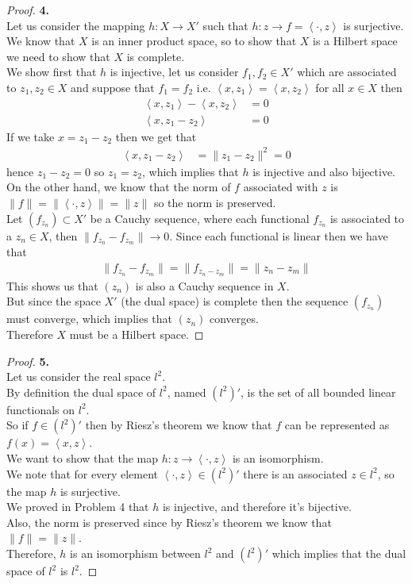 \documentclass[11pt]{article}
\newcommand{\inprd}[1]{\left\langle{#1}\right\rangle}
\theoremstyle{definition}
\begin{document}
\cleardoublepage
\begin{proof}{\textbf{4.}}\\
Let us consider the mapping $h:X \to X'$ such that $h:z \to f = \inprd{\cdot, z}$
is surjective.\\
We know that $X$ is an inner product space, so to show that $X$ is a Hilbert
space we need to show that $X$ is complete.\\
We show first that $h$ is injective, let us consider $f_1, f_2 \in X'$ which 
are associated to $z_1, z_2 \in X$ and suppose that $f_1 = f_2$ i.e.
$\inprd{x,z_1} = \inprd{x, z_2}$ for all $x \in X$ then
\begin{align*}
    \inprd{x,z_1} - \inprd{x, z_2} &= 0\\
    \inprd{x,z_1 - z_2} &= 0
\end{align*}
If we take $x = z_1 - z_2$ then we get that
\begin{align*}
    \inprd{x,z_1 - z_2} &= \|z_1 - z_2\|^2 = 0
\end{align*}
hence $z_1 - z_2 = 0$ so $z_1 = z_2$, which implies that $h$ is injective and
also bijective.\\
On the other hand, we know that the norm of $f$ associated with $z$ is
$\|f\| = \|\inprd{\cdot, z}\| = \|z\|$ so the norm is preserved.\\
Let $(f_{z_n})\subset X'$ be a Cauchy sequence, where each functional $f_{z_n}$
is associated to a $z_n \in X$, then $\|f_{z_n} - f_{z_m}\| \to 0$. Since each 
functional is linear then we have that
\begin{align*}
    \|f_{z_n} - f_{z_m}\| = \|f_{z_n - z_m}\| = \|z_n - z_m\|
\end{align*}
This shows us that $(z_n)$ is also a Cauchy sequence in $X$. \\
But since the space $X'$ (the dual space) is complete then the sequence
$(f_{z_n})$ must converge, which implies that $(z_n)$ converges.\\
Therefore $X$ must be a Hilbert space.
\end{proof}

\cleardoublepage
\begin{proof}{\textbf{5.}}\\
Let us consider the real space $l^2$.\\
By definition the dual space of $l^2$, named $(l^2)'$, is the set of all
bounded linear functionals on $l^2$.\\
So if $f \in (l^2)'$ then by Riesz's theorem we know that $f$ can be
represented as $f(x) = \inprd{x, z}$.\\
We want to show that the map $h: z \to \inprd{\cdot, z}$ is an isomorphism.\\
We note that for every element $\inprd{\cdot, z} \in (l^2)'$ there is an
associated $z \in l^2$, so the map $h$ is surjective.\\
We proved in Problem 4 that $h$ is injective, and therefore it's bijective.\\
Also, the norm is preserved since by Riesz's theorem we know that
$\|f\| = \|z\|$.\\
Therefore, $h$ is an isomorphism between $l^2$ and $(l^2)'$ which implies that
the dual space of $l^2$ is $l^2$.    
\end{proof}
\end{document}
